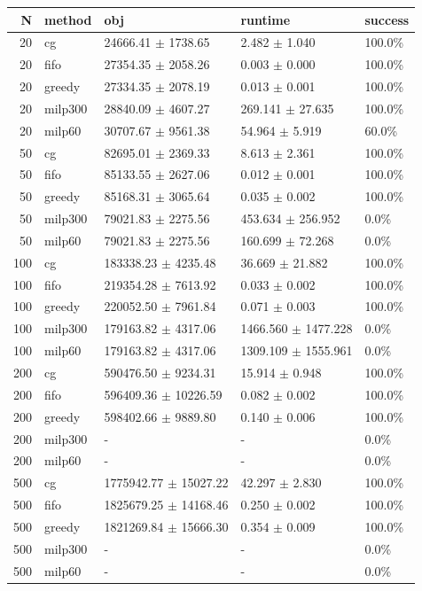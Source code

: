 \begin{tabular}{rllll}
\toprule
N & method & obj & runtime & success \\
\midrule
20 & cg & 24666.41 $\pm$ 1738.65 & 2.482 $\pm$ 1.040 & 100.0\% \\
20 & fifo & 27354.35 $\pm$ 2058.26 & 0.003 $\pm$ 0.000 & 100.0\% \\
20 & greedy & 27334.35 $\pm$ 2078.19 & 0.013 $\pm$ 0.001 & 100.0\% \\
20 & milp300 & 28840.09 $\pm$ 4607.27 & 269.141 $\pm$ 27.635 & 100.0\% \\
20 & milp60 & 30707.67 $\pm$ 9561.38 & 54.964 $\pm$ 5.919 & 60.0\% \\
50 & cg & 82695.01 $\pm$ 2369.33 & 8.613 $\pm$ 2.361 & 100.0\% \\
50 & fifo & 85133.55 $\pm$ 2627.06 & 0.012 $\pm$ 0.001 & 100.0\% \\
50 & greedy & 85168.31 $\pm$ 3065.64 & 0.035 $\pm$ 0.002 & 100.0\% \\
50 & milp300 & 79021.83 $\pm$ 2275.56 & 453.634 $\pm$ 256.952 & 0.0\% \\
50 & milp60 & 79021.83 $\pm$ 2275.56 & 160.699 $\pm$ 72.268 & 0.0\% \\
100 & cg & 183338.23 $\pm$ 4235.48 & 36.669 $\pm$ 21.882 & 100.0\% \\
100 & fifo & 219354.28 $\pm$ 7613.92 & 0.033 $\pm$ 0.002 & 100.0\% \\
100 & greedy & 220052.50 $\pm$ 7961.84 & 0.071 $\pm$ 0.003 & 100.0\% \\
100 & milp300 & 179163.82 $\pm$ 4317.06 & 1466.560 $\pm$ 1477.228 & 0.0\% \\
100 & milp60 & 179163.82 $\pm$ 4317.06 & 1309.109 $\pm$ 1555.961 & 0.0\% \\
200 & cg & 590476.50 $\pm$ 9234.31 & 15.914 $\pm$ 0.948 & 100.0\% \\
200 & fifo & 596409.36 $\pm$ 10226.59 & 0.082 $\pm$ 0.002 & 100.0\% \\
200 & greedy & 598402.66 $\pm$ 9889.80 & 0.140 $\pm$ 0.006 & 100.0\% \\
200 & milp300 & - & - & 0.0\% \\
200 & milp60 & - & - & 0.0\% \\
500 & cg & 1775942.77 $\pm$ 15027.22 & 42.297 $\pm$ 2.830 & 100.0\% \\
500 & fifo & 1825679.25 $\pm$ 14168.46 & 0.250 $\pm$ 0.002 & 100.0\% \\
500 & greedy & 1821269.84 $\pm$ 15666.30 & 0.354 $\pm$ 0.009 & 100.0\% \\
500 & milp300 & - & - & 0.0\% \\
500 & milp60 & - & - & 0.0\% \\
\bottomrule
\end{tabular}
